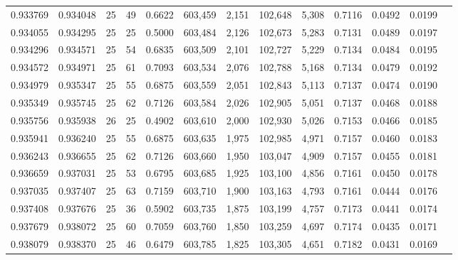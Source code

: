 \begin{tabular}{rrrrrrrrrrrrr}
0.933769 & 0.934048 &    25 &  49 &                                     0.6622 & 603,459 &   2,151 & 102,648 &   5,308 & 0.7116 & 0.0492 & 0.0199 \\
0.934055 & 0.934295 &    25 &  25 &                                     0.5000 & 603,484 &   2,126 & 102,673 &   5,283 & 0.7131 & 0.0489 & 0.0197 \\
0.934296 & 0.934571 &    25 &  54 &                                     0.6835 & 603,509 &   2,101 & 102,727 &   5,229 & 0.7134 & 0.0484 & 0.0195 \\
0.934572 & 0.934971 &    25 &  61 &                                     0.7093 & 603,534 &   2,076 & 102,788 &   5,168 & 0.7134 & 0.0479 & 0.0192 \\
0.934979 & 0.935347 &    25 &  55 &                                     0.6875 & 603,559 &   2,051 & 102,843 &   5,113 & 0.7137 & 0.0474 & 0.0190 \\
0.935349 & 0.935745 &    25 &  62 &                                     0.7126 & 603,584 &   2,026 & 102,905 &   5,051 & 0.7137 & 0.0468 & 0.0188 \\
0.935756 & 0.935938 &    26 &  25 &                                     0.4902 & 603,610 &   2,000 & 102,930 &   5,026 & 0.7153 & 0.0466 & 0.0185 \\
0.935941 & 0.936240 &    25 &  55 &                                     0.6875 & 603,635 &   1,975 & 102,985 &   4,971 & 0.7157 & 0.0460 & 0.0183 \\
0.936243 & 0.936655 &    25 &  62 &                                     0.7126 & 603,660 &   1,950 & 103,047 &   4,909 & 0.7157 & 0.0455 & 0.0181 \\
0.936659 & 0.937031 &    25 &  53 &                                     0.6795 & 603,685 &   1,925 & 103,100 &   4,856 & 0.7161 & 0.0450 & 0.0178 \\
0.937035 & 0.937407 &    25 &  63 &                                     0.7159 & 603,710 &   1,900 & 103,163 &   4,793 & 0.7161 & 0.0444 & 0.0176 \\
0.937408 & 0.937676 &    25 &  36 &                                     0.5902 & 603,735 &   1,875 & 103,199 &   4,757 & 0.7173 & 0.0441 & 0.0174 \\
0.937679 & 0.938072 &    25 &  60 &                                     0.7059 & 603,760 &   1,850 & 103,259 &   4,697 & 0.7174 & 0.0435 & 0.0171 \\
0.938079 & 0.938370 &    25 &  46 &                                     0.6479 & 603,785 &   1,825 & 103,305 &   4,651 & 0.7182 & 0.0431 & 0.0169 \\

\end{tabular}
